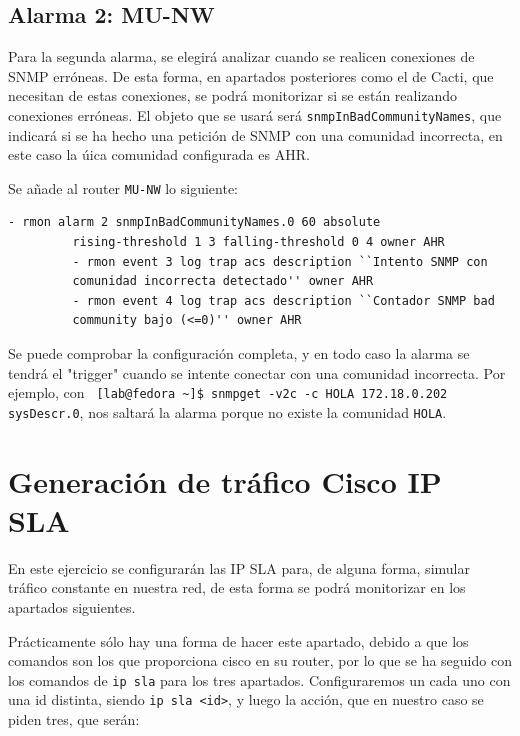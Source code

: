 \documentclass[11pt]{article}
\begin{document}
\newpage

\subsection{Alarma 2: MU-NW}

Para la segunda alarma, se elegirá analizar cuando se realicen conexiones de SNMP erróneas. De esta forma, en apartados posteriores como el de Cacti, que necesitan de estas conexiones, se podrá monitorizar si se están realizando conexiones erróneas. El objeto que se usará será \texttt{snmpInBadCommunityNames}, que indicará si se ha hecho una petición de SNMP con una comunidad incorrecta, en este caso la úica comunidad configurada es AHR.

Se añade al router \texttt{MU-NW} lo siguiente:

\begin{tcolorbox}[
    boxrule=0pt,
    title=Configuración RMON Alarma 2 en MU-SW,
]
    \begin{lstlisting}[gobble=6]
         - rmon alarm 2 snmpInBadCommunityNames.0 60 absolute
         rising-threshold 1 3 falling-threshold 0 4 owner AHR
         - rmon event 3 log trap acs description ``Intento SNMP con
         comunidad incorrecta detectado'' owner AHR
         - rmon event 4 log trap acs description ``Contador SNMP bad
         community bajo (<=0)'' owner AHR
    \end{lstlisting}
\end{tcolorbox}


Se puede comprobar la configuración completa, y en todo caso la alarma se tendrá el "trigger" cuando se intente conectar con una comunidad incorrecta. Por ejemplo, con \texttt{
[lab@fedora \textasciitilde ]\$ snmpget -v2c -c HOLA 172.18.0.202 sysDescr.0}, nos saltará la alarma porque no existe la comunidad \texttt{HOLA}.


\section{\texorpdfstring{Generación de tráfico Cisco IP SLA}{Generacion de trafico Cisco IP SLA} \label{section:Generacion de trafico Cisco IP SLA}}

En este ejercicio se configurarán las IP SLA para, de alguna forma, simular tráfico constante en nuestra red, de esta forma se podrá monitorizar en los apartados siguientes.

Prácticamente sólo hay una forma de hacer este apartado, debido a que los comandos son los que proporciona cisco en su router, por lo que se ha seguido con los comandos de \texttt{ip sla} para los tres apartados. Configuraremos un cada uno con una id distinta, siendo \texttt{ip sla <id>}, y luego la acción, que en nuestro caso se piden tres, que serán:
\end{document}
